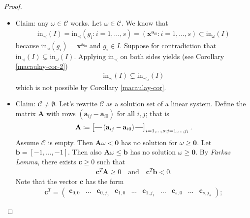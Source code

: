 \documentclass[a4paper, 11pt]{article}
\newcommand*{\horzbar}{\rule[.5ex]{2.5ex}{0.5pt}}
\begin{document}
\begin{proof}
  \begin{itemize}
    \item Claim: any \( \omega \in \mathcal{C} \) works. Let \( \omega \in \mathcal{C} \).  We know that 
    \begin{align*}
     \mathrm{in}_\prec (I) = \mathrm{in}_\prec(g_i : i = 1, \dots, s) = (\mathbf x^{\mathbf a_{i0}} : i =1, \dots, s) \subset \mathrm{in}_\omega (I)
    \end{align*}
    because \( \mathrm{in}_\omega(g_i) = \mathbf x^{\mathbf a_{i0}} \) and \( g_i \in I \). Suppose for contradiction that \( \mathrm{in}_\prec (I) \subsetneq \mathrm{in}_\omega(I) \). Applying \( \mathrm{in}_\prec \) on both sides yields (see Corollary \ref{macaulay-cor-2}) 
    \begin{align*}
      \mathrm{in}_\prec(I) \subsetneq \mathrm{in}_{\prec_\omega}(I)
    \end{align*}
    which is not possible by Corollary \ref{macaulay-cor}.
    \item Claim: \( \mathcal{C} \neq \emptyset \). Let's rewrite \( \mathcal{C} \) as a solution set of a linear system. Define the matrix \( \mathbf A \) with rows \( (\mathbf a_{ij} - \mathbf a_{i0}) \) for all \( i,j \); that is
    \begin{align*}
      \mathbf A \coloneqq \begin{bmatrix}
        \horzbar \, (\mathbf{a}_{ij} - \mathbf{a}_{i0}) \, \horzbar \\
      \end{bmatrix}_{i=1,...,s; j = 1,...,j_i}.
    \end{align*}
    Assume \( \mathcal C \) is empty. Then \( \mathbf A \omega < \mathbf 0 \) has no solution for \( \omega \geq \mathbf 0 \).
    Let \( \mathbf b = [-1, \dots , -1] \). Then also \(  \mathbf A \omega \leq \mathbf b \) has no solution \( \omega \geq \mathbf 0 \). By \emph{Farkas Lemma}, there exists \( \mathbf c \geq 0 \) such that 
    \begin{align*}
      \mathbf{c}^T \mathbf A \geq 0 \quad \text{and} \quad \mathbf{c}^T\mathbf{b} < 0.
    \end{align*}
    Note that the vector \( \mathbf c \) has the form 
    \begin{align*}
      \mathbf  c^T = \begin{pmatrix}
        \mathbf c_{0,0} & ... &\mathbf c_{0,j_0} &\mathbf c_{1,0} & ... &\mathbf c_{1,j_1} & ... & \mathbf c_{s,0} & ... & \mathbf c_{s,j_s}
      \end{pmatrix};
    \end{align*}

\end{itemize}
\end{proof}
\end{document}
